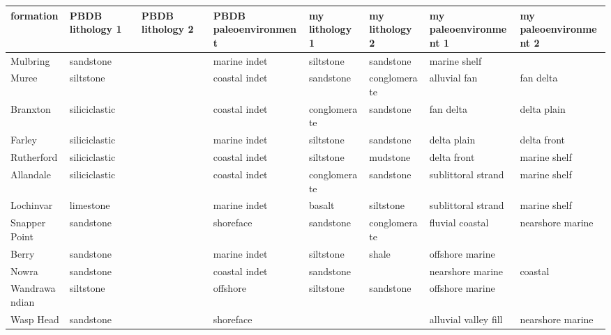 \begin{table}[ht]
\centering
\begin{tabular}{llllllll}
  \hline
formation & PBDB lithology 1 & PBDB lithology 2 & PBDB paleoenvironment & my lithology 1 & my lithology 2 & my paleoenvironment 1 & my paleoenvironment 2 \\ 
  \hline
Mulbring & sandstone &  & marine indet & siltstone & sandstone & marine shelf &  \\ 
  Muree & siltstone &  & coastal indet & sandstone & conglomerate & alluvial fan & fan delta \\ 
  Branxton & siliciclastic &  & coastal indet & conglomerate & sandstone & fan delta & delta plain \\ 
  Farley & siliciclastic &  & marine indet & siltstone & sandstone & delta plain & delta front \\ 
  Rutherford & siliciclastic &  & coastal indet & siltstone & mudstone & delta front & marine shelf \\ 
  Allandale & siliciclastic &  & coastal indet & conglomerate & sandstone & sublittoral strand & marine shelf \\ 
  Lochinvar & limestone &  & marine indet & basalt & siltstone & sublittoral strand & marine shelf \\ 
  Snapper Point & sandstone &  & shoreface & sandstone & conglomerate & fluvial coastal & nearshore marine \\ 
  Berry & sandstone &  & marine indet & siltstone & shale & offshore marine &  \\ 
  Nowra & sandstone &  & coastal indet & sandstone &  & nearshore marine & coastal \\ 
  Wandrawandian & siltstone &  & offshore & siltstone & sandstone & offshore marine &  \\ 
  Wasp Head & sandstone &  & shoreface &  &  & alluvial valley fill & nearshore marine \\ 
   \hline
\end{tabular}
\label{tab:paleoenv}
\end{table}
